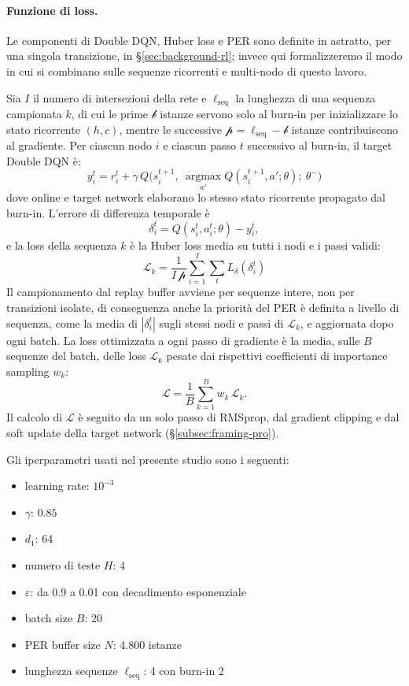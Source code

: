 \paragraph{Funzione di loss.}
Le componenti di Double DQN, Huber loss e PER
sono definite in astratto, per una singola transizione, in
§\ref{sec:background-rl}; invece qui formalizzeremo il modo in cui si combinano sulle sequenze
ricorrenti e multi-nodo di questo lavoro.

Sia $I$ il numero di intersezioni della rete e $\ell_{\text{seq}}$ la lunghezza di una sequenza campionata $k$,
di cui le prime $\mathscr{b}$ istanze servono solo al burn-in per inizializzare lo stato ricorrente $(h,c)$,
mentre le successive $\mathscr{p} = \ell_{\text{seq}} - \mathscr{b}$ istanze contribuiscono al gradiente.
Per ciascun nodo $i$ e ciascun passo $t$ successivo al burn-in, il target Double DQN è:
\begin{equation}
  y_i^t = r_i^t + \gamma\, Q\big(s_i^{t+1},\ \operatorname*{argmax}_{a'} Q(s_i^{t+1}, a'; \theta);\ \theta^-\big)
  \label{eq:double-dqn-target}
\end{equation}
dove online e target network elaborano lo stesso stato ricorrente propagato dal burn-in.
L'errore di differenza temporale è
\[\delta_i^t = Q(s_i^t, a_i^t; \theta) - y_i^t,\]
e la loss della sequenza $k$ è la Huber loss media su tutti i nodi e i passi
validi:
\begin{equation}
  \mathcal{L}_k = \frac{1}{I\,\mathscr{p}} \sum_{i=1}^{I} \sum_{t} L_\delta(\delta_i^t)
\end{equation}
Il campionamento dal replay buffer avviene per sequenze intere, non per
transizioni isolate, di conseguenza anche la priorità del PER è definita a
livello di sequenza, come la media di $|\delta_i^t|$ sugli stessi nodi e
passi di $\mathcal{L}_k$, e aggiornata dopo ogni batch. La loss ottimizzata a
ogni passo di gradiente è la media, sulle $B$ sequenze del batch, delle loss
$\mathcal{L}_k$ pesate dai rispettivi coefficienti di importance sampling
$w_k$:
\begin{equation}
  \mathcal{L} = \frac{1}{B} \sum_{k=1}^{B} w_k\, \mathcal{L}_k .
\end{equation}
Il calcolo di \(\mathcal{L}\) è seguito da un solo passo di RMSprop,
dal gradient clipping e dal soft update della target network (§\ref{subsec:framing-pro}).

Gli iperparametri usati nel presente studio sono i seguenti:
\begin{itemize}
  \item learning rate: $10^{-3} $
  \item $\gamma$: $0.85$
  \item $d_1$: 64
  \item numero di teste $H$: 4
  \item $\varepsilon$: da 0.9 a 0.01 con decadimento esponenziale
  \item batch size $B$: 20
  \item PER buffer size $N$: 4.800 istanze
  \item lunghezza sequenze $\ell_{\text{seq}}$: 4 con burn-in 2
\end{itemize}

